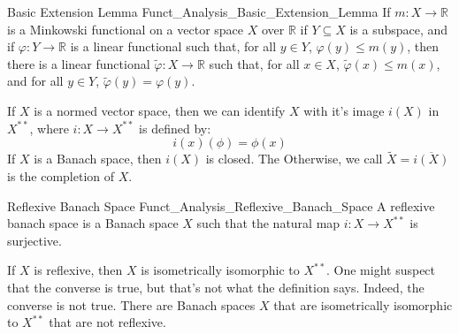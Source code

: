         \begin{ltheorem}{Basic Extension Lemma}
              {Funct_Analysis_Basic_Extension_Lemma}
            If $m:X\rightarrow\mathbb{R}$ is a Minkowski functional
            on a vector space $X$ over $\mathbb{R}$ if
            $Y\subseteq{X}$ is a subspace, and if
            $\varphi:Y\rightarrow\mathbb{R}$ is a linear functional
            such that, for all $y\in{Y}$,
            $\varphi(y)\leq{m}(y)$, then there is a linear
            functional $\tilde{\varphi}:X\rightarrow\mathbb{R}$
            such that, for all $x\in{X}$,
            $\tilde{\varphi}(x)\leq{m}(x)$, and for all $y\in{Y}$,
            $\tilde{\varphi}(y)=\varphi(y)$.
        \end{ltheorem}
        If $X$ is a normed vector space, then we can identify
        $X$ with it's image $i(X)$ in $X^{**}$, where
        $i:X\rightarrow{X}^{**}$ is defined by:
        \begin{equation}
            i(x)(\phi)=\phi(x)
        \end{equation}
        If $X$ is a Banach space, then $i(X)$ is closed. The
        Otherwise, we call $\tilde{X}=\overline{i(X)}$ is the
        completion of $X$.
        \begin{ldefinition}{Reflexive Banach Space}
              {Funct_Analysis_Reflexive_Banach_Space}
            A reflexive banach space is a Banach space $X$ such
            that the natural map $i:X\rightarrow{X}^{**}$ is
            surjective.
        \end{ldefinition}
        If $X$ is reflexive, then $X$ is isometrically isomorphic
        to $X^{**}$. One might suspect that the converse is true,
        but that's not what the definition says. Indeed, the
        converse is not true. There are Banach spaces $X$ that
        are isometrically isomorphic to $X^{**}$ that are not
        reflexive.
